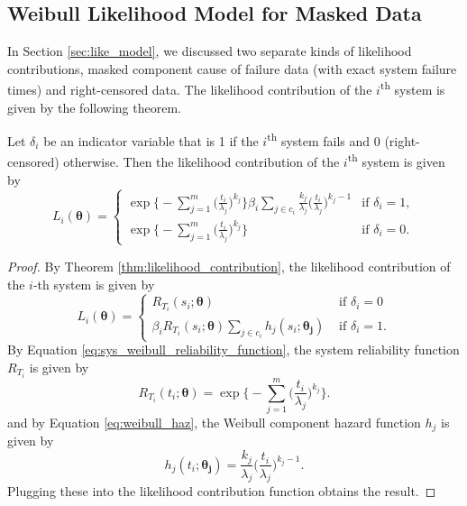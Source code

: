 \documentclass[
]{article}
\begin{document}
\hypertarget{weibull-likelihood-model-for-masked-data}{%
\subsection{Weibull Likelihood Model for Masked
Data}\label{weibull-likelihood-model-for-masked-data}}

In Section \ref{sec:like_model}, we discussed two separate kinds of
likelihood contributions, masked component cause of failure data (with
exact system failure times) and right-censored data. The likelihood
contribution of the \(i\)\textsuperscript{th} system is given by the
following theorem.

\begin{theorem}
Let $\delta_i$ be an indicator variable that is 1 if the
$i$\textsuperscript{th} system fails and 0 (right-censored) otherwise.
Then the likelihood contribution of the $i$\textsuperscript{th} system is given by
\begin{equation}
\label{eq:weibull_likelihood_contribution}
L_i(\boldsymbol{\theta}) =
\begin{cases}
    \exp\biggl\{-\sum_{j=1}^{m}\bigl(\frac{t_i}{\lambda_j}\bigr)^{k_j}\biggr\}
        \beta_i \sum_{j \in c_i} \frac{k_j}{\lambda_j}\bigl(\frac{t_i}{\lambda_j}\bigr)^{k_j-1}
    & \text{if } \delta_i = 1,\\
    \exp\bigl\{-\sum_{j=1}^{m}\bigl(\frac{t_i}{\lambda_j}\bigr)^{k_j}\biggr\} & \text{if } \delta_i = 0.
\end{cases}
\end{equation}
\end{theorem}
\begin{proof}
By Theorem \ref{thm:likelihood_contribution}, the likelihood contribution of the
$i$-th system is given by
$$
L_i(\boldsymbol{\theta}) =
\begin{cases}
    R_{T_i}(s_i;\boldsymbol{\theta})                      &\text{ if } \delta_i = 0\\
    \beta_i R_{T_i}(s_i;\boldsymbol{\theta})
        \sum_{j\in c_i} h_j(s_i;\boldsymbol{\theta_j})   &\text{ if } \delta_i = 1.
\end{cases}
$$
By Equation \eqref{eq:sys_weibull_reliability_function}, the system reliability
function $R_{T_i}$ is given by
$$
R_{T_i}(t_i;\boldsymbol{\theta}) = \exp\biggl\{-\sum_{j=1}^{m}\biggl(\frac{t_i}{\lambda_j}\biggr)^{k_j}\biggr\}.
$$
and by Equation \eqref{eq:weibull_haz}, the Weibull component hazard function $h_j$ is
given by
$$
h_j(t_i;\boldsymbol{\theta_j}) = \frac{k_j}{\lambda_j}\biggl(\frac{t_i}{\lambda_j}\biggr)^{k_j-1}.
$$
Plugging these into the likelihood contribution function obtains the result.
\end{proof}
\end{document}
